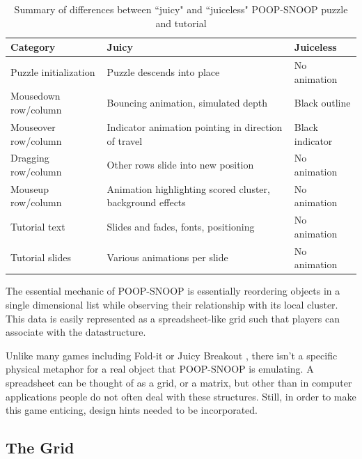 \begin{table}
\begin{center}

\begin{tabular}{|>{\centering}p{3cm}|>{\centering}p{5cm}|>{\centering}p{5cm}|}
\hline 
Category&  Juicy&  Juiceless
\tabularnewline
\hline 

Puzzle initialization&  Puzzle descends into place&  No animation
\tabularnewline
\hline 

Mousedown row/column&  Bouncing animation, simulated depth&  Black outline
\tabularnewline
\hline 

Mouseover row/column&  Indicator animation pointing in direction of travel&  Black indicator
\tabularnewline
\hline 

Dragging row/column&  Other rows slide into new position&  No animation
\tabularnewline
\hline 

Mouseup row/column&  Animation highlighting scored cluster, background effects&  No animation
\tabularnewline
\hline 

Tutorial text&  Slides and fades, fonts, positioning&  No animation
\tabularnewline
\hline

Tutorial slides& Various animations per slide&  No animation
\tabularnewline
\hline

\end{tabular}

\caption{Summary of differences between ``juicy" and ``juiceless" POOP-SNOOP puzzle and tutorial}
\label{table:juice}
\end{center}
\end{table}

The essential mechanic of POOP-SNOOP is essentially reordering objects in a single dimensional list while observing their relationship with its local cluster. This data is easily represented as a spreadsheet-like grid such that players can associate with the datastructure.

Unlike many games including Fold-it \cite{cooper2010challenge} or Juicy Breakout \cite{juiceitorloseit}, there isn't a specific physical metaphor for a real object that POOP-SNOOP is emulating. A spreadsheet can be thought of as a grid, or a matrix, but other than in computer applications people do not often deal with these structures. Still, in order to make this game enticing, design hints needed to be incorporated.

\subsection{The Grid}

